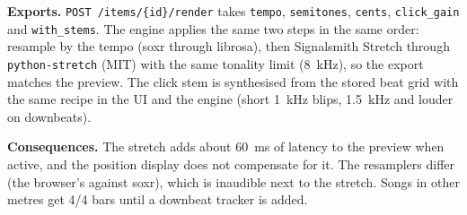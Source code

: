 \textbf{Exports.} \texttt{POST /items/\{id\}/render} takes \texttt{tempo},
\texttt{semitones}, \texttt{cents}, \texttt{click\_gain} and
\texttt{with\_stems}. The engine applies the same two steps in the same order:
resample by the tempo (soxr through librosa), then Signalsmith Stretch through
\texttt{python-stretch} (MIT) with the same tonality limit (8~kHz), so the
export matches the preview. The click stem is synthesised from the stored beat
grid with the same recipe in the UI and the engine (short 1~kHz blips, 1.5~kHz
and louder on downbeats).

\textbf{Consequences.} The stretch adds about 60~ms of latency to the preview
when active, and the position display does not compensate for it. The
resamplers differ (the browser's against soxr), which is inaudible next to the
stretch. Songs in other metres get 4/4 bars until a downbeat tracker is added.
